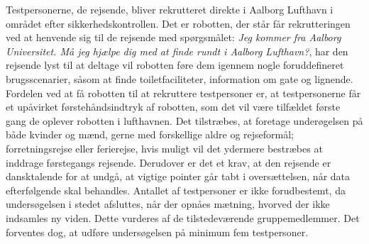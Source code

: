 Testpersonerne, de rejsende, bliver rekrutteret direkte i Aalborg Lufthavn i området efter sikkerhedskontrollen. Det er robotten, der står får rekrutteringen ved at henvende sig til de rejsende med spørgsmålet: \textit{Jeg kommer fra Aalborg Universitet. Må jeg hjælpe dig med at finde rundt i Aalborg Lufthavn?}, har den rejsende lyst til at deltage vil robotten føre dem igennem nogle foruddefineret brugsscenarier, såsom at finde toiletfaciliteter, information om gate og lignende. Fordelen ved at få robotten til at rekruttere testpersoner er, at testpersonerne får et upåvirket førstehåndsindtryk af robotten, som det vil være tilfældet første gang de oplever robotten i lufthavnen. \blankline 
%
Det tilstræbes, at foretage underøgelsen på både kvinder og mænd, gerne med forskellige aldre og rejseformål; forretningsrejse eller ferierejse, hvis muligt vil det ydermere bestræbes at inddrage førstegangs rejsende. Derudover er det et krav, at den rejsende er dansktalende for at undgå, at vigtige pointer går tabt i oversættelsen, når data efterfølgende skal behandles. Antallet af testpersoner er ikke forudbestemt, da undersøgelsen i stedet afsluttes, når der opnåes mætning, hvorved der ikke indsamles ny viden. Dette vurderes af de tilstedeværende gruppemedlemmer. Det forventes dog, at udføre undersøgelsen på minimum fem testpersoner.


